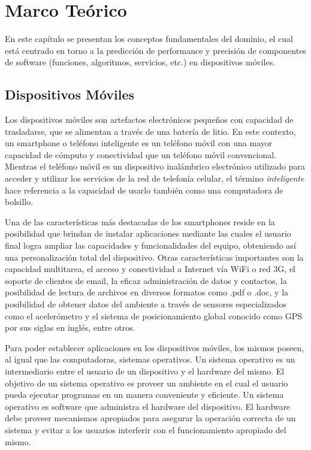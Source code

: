 
\chapter{Marco Teórico\label{chap:Marco-Teorico}}

En este capítulo se presentan los conceptos fundamentales del dominio,
el cual está centrado en torno a la predicción de performance y precisión
de componentes de software (funciones, algoritmos, servicios, etc.)
en dispositivos móviles.


\section{Dispositivos Móviles\label{sec:Dispositivos-m=0000F3viles}}

Los dispositivos móviles son artefactos electrónicos pequeños con
capacidad de trasladarse, que se alimentan a través de una batería
de litio. En este contexto, un smartphone o teléfono inteligente es
un teléfono móvil con una mayor capacidad de cómputo y conectividad
que un teléfono móvil convencional. Mientras el teléfono móvil es
un dispositivo inalámbrico electrónico utilizado para acceder y utilizar
los servicios de la red de telefonía celular, el término \emph{inteligente}
hace referencia a la capacidad de usarlo también como una computadora
de bolsillo.

Una de las características más destacadas de los smartphones reside
en la posibilidad que brindan de instalar aplicaciones mediante las
cuales el usuario final logra ampliar las capacidades y funcionalidades
del equipo, obteniendo así una personalización total del dispositivo.
Otras características importantes son la capacidad multitarea, el
acceso y conectividad a Internet vía WiFi o red 3G, el soporte de
clientes de email, la eficaz administración de datos y contactos,
la posibilidad de lectura de archivos en diversos formatos como .pdf
o .doc, y la posibilidad de obtener datos del ambiente a través de
sensores especializados como el acelerómetro y el sistema de posicionamiento
global conocido como GPS por sus siglas en inglés, entre otros. 

Para poder establecer aplicaciones en los dispositivos móviles, los
mismos poseen, al igual que las computadoras, sistemas operativos.
Un sistema operativo es un intermediario entre el usuario de un dispositivo
y el hardware del mismo. El objetivo de un sistema operativo es proveer
un ambiente en el cual el usuario pueda ejecutar programas en un manera
conveniente y eficiente. Un sistema operativo es software que administra
el hardware del dispositivo. El hardware debe proveer mecanismos apropiados
para asegurar la operación correcta de un sistema y evitar a los usuarios
interferir con el funcionamiento apropiado del mismo. 

